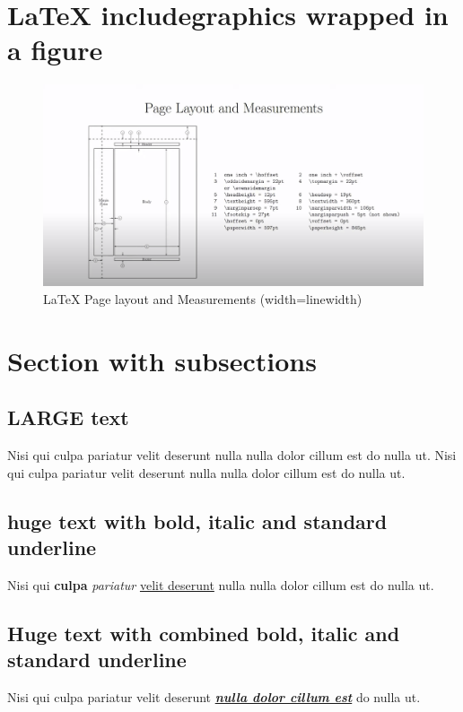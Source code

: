 \documentclass[12pt]{article}
\begin{document}
\section{LaTeX includegraphics wrapped in a figure}
\begin{figure}[ht!]
    \centering
    \includegraphics[width=\linewidth]{page_layout.png}
    \caption{LaTeX Page layout and Measurements (width=linewidth)}
    \label{hr_3}
\end{figure}

\section{Section with subsections}

\subsection{LARGE text}
{\LARGE \indent Nisi qui culpa pariatur velit deserunt nulla nulla dolor cillum est do nulla ut. Nisi qui culpa pariatur velit deserunt nulla nulla dolor cillum est do nulla ut.}

\subsection{huge text with bold, italic and standard underline}
{\huge \indent Nisi qui \textbf{culpa} \textit{pariatur} \underline{velit deserunt} nulla nulla dolor cillum est do nulla ut.} \\

\subsection{Huge text with combined bold, italic and standard underline}
{\Huge \indent Nisi qui culpa pariatur velit deserunt \underline{\textbf{\textit{nulla dolor cillum est}}} do nulla ut.} \\
\end{document}
